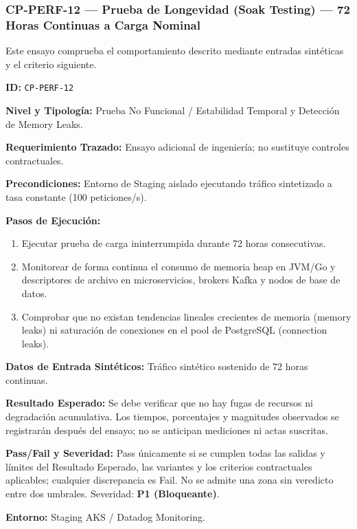 \subsubsection*{CP-PERF-12 — Prueba de Longevidad (Soak Testing) — 72 Horas Continuas a Carga Nominal}\label{sec:9-cp-perf-12}
Este ensayo comprueba el comportamiento descrito mediante entradas sintéticas y el criterio siguiente.

\par\noindent\textbf{ID:} \texttt{C\allowbreak{}P\allowbreak{}-\allowbreak{}P\allowbreak{}E\allowbreak{}R\allowbreak{}F\allowbreak{}-\allowbreak{}1\allowbreak{}2\allowbreak{}}\par
\par\noindent\textbf{Nivel y Tipología:} Prueba No Funcional / Estabilidad Temporal y Detección de Memory Leaks.\par
\par\noindent\textbf{Requerimiento Trazado:} Ensayo adicional de ingeniería; no sustituye controles contractuales.\par
\par\noindent\textbf{Precondiciones:} Entorno de Staging aislado ejecutando tráfico sintetizado a tasa constante (100 peticiones/s).\par
\par\noindent\textbf{Pasos de Ejecución:} \par
\begin{enumerate}
\item Ejecutar prueba de carga ininterrumpida durante 72 horas consecutivas.
\item Monitorear de forma continua el consumo de memoria heap en JVM/Go y descriptores de archivo en microservicios, brokers Kafka y nodos de base de datos.
\item Comprobar que no existan tendencias lineales crecientes de memoria (memory leaks) ni saturación de conexiones en el pool de PostgreSQL (connection leaks).
\end{enumerate}
\par\noindent\textbf{Datos de Entrada Sintéticos:} Tráfico sintético sostenido de 72 horas continuas.\par
\par\noindent\textbf{Resultado Esperado:} Se debe verificar que no hay fugas de recursos ni degradación acumulativa. Los tiempos, porcentajes y magnitudes observados se registrarán después del ensayo; no se anticipan mediciones ni actas suscritas.\par
\par\noindent\textbf{Pass/Fail y Severidad:} Pass únicamente si se cumplen todas las salidas y límites del Resultado Esperado, las variantes y los criterios contractuales aplicables; cualquier discrepancia es Fail. No se admite una zona sin veredicto entre dos umbrales. Severidad: \textbf{P1 (Bloqueante)}.\par
\par\noindent\textbf{Entorno:} Staging AKS / Datadog Monitoring.\par


